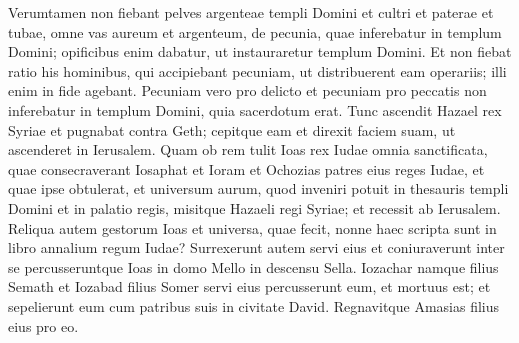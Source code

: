 \begin{biblechapter}
\begin{biblechapter}
\begin{biblechapter}
\begin{biblechapter}
\begin{biblechapter}
\begin{biblechapter}
\begin{biblechapter}
\begin{biblechapter}
\begin{biblechapter}
\begin{biblechapter}
\begin{biblechapter}
\begin{biblechapter}
\verse Verumtamen non fiebant pelves argenteae templi Domini et cultri et paterae et tubae, omne vas aureum et argenteum, de pecunia, quae inferebatur in templum Domini; 
\verse opificibus enim dabatur, ut instauraretur templum Domini. 
\verse Et non fiebat ratio his hominibus, qui accipiebant pecuniam, ut distribuerent eam operariis; illi enim in fide agebant. 
\verse Pecuniam vero pro delicto et pecuniam pro peccatis non inferebatur in templum Domini, quia sacerdotum erat.
 \verse Tunc ascendit Hazael rex Syriae et pugnabat contra Geth; cepitque eam et direxit faciem suam, ut ascenderet in Ierusalem. 
\verse Quam ob rem tulit Ioas rex Iudae omnia sanctificata, quae consecraverant Iosaphat et Ioram et Ochozias patres eius reges Iudae, et quae ipse obtulerat, et universum aurum, quod inveniri potuit in thesauris templi Domini et in palatio regis, misitque Hazaeli regi Syriae; et recessit ab Ierusalem.
 \verse Reliqua autem gestorum Ioas et universa, quae fecit, nonne haec scripta sunt in libro annalium regum Iudae? 
\verse Surrexerunt autem servi eius et coniuraverunt inter se percusseruntque Ioas in domo Mello in descensu Sella. 
 \verse Iozachar namque filius Semath et Iozabad filius Somer servi eius percusserunt eum, et mortuus est; et sepelierunt eum cum patribus suis in civitate David. Regnavitque Amasias filius eius pro eo.
 

\end{biblechapter}
\end{biblechapter}
\end{biblechapter}
\end{biblechapter}
\end{biblechapter}
\end{biblechapter}
\end{biblechapter}
\end{biblechapter}
\end{biblechapter}
\end{biblechapter}
\end{biblechapter}
\end{biblechapter}
